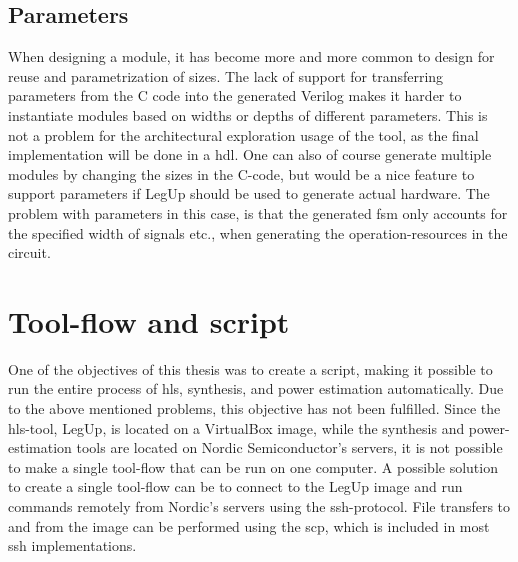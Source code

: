 \subsection{\label{subsec:parameterprobs}Parameters}
When designing a module, it has become more and more common to design for reuse and parametrization of sizes. The lack of support for transferring parameters from the C code into the generated Verilog makes it harder to instantiate modules based on widths or depths of different parameters. This is not a problem for the architectural exploration usage of the tool, as the final implementation will be done in a \gls{hdl}. One can also of course generate multiple modules by changing the sizes in the C-code, but would be a nice feature to support parameters if LegUp should be used to generate actual hardware. The problem with parameters in this case, is that the generated \gls{fsm} only accounts for the specified width of signals etc., when generating the operation-resources in the circuit.

\section{Tool-flow and script}
One of the objectives of this thesis was to create a script, making it possible to run the entire process of \gls{hls}, synthesis, and power estimation automatically. Due to the above mentioned problems, this objective has not been fulfilled. Since the \gls{hls}-tool, LegUp, is located on a VirtualBox image, while the synthesis and power-estimation tools are located on Nordic Semiconductor's servers, it is not possible to make a single tool-flow that can be run on one computer. A possible solution to create a single tool-flow can be to connect to the LegUp image and run commands remotely from Nordic's servers using the \gls{ssh}-protocol. File transfers to and from the image can be performed using the \gls{scp}, which is included in most \gls{ssh} implementations.